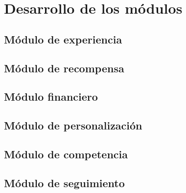 
\chapter{Desarrollo de los módulos}\label{mod:concentrado}

    \section{Módulo de experiencia}\label{mod:exp}
    

    \section{Módulo de recompensa}\label{mod:recomp}

    \section{Módulo financiero}\label{mod:financ}

    \section{Módulo de personalización}\label{mod:pers}

    \section{Módulo de competencia}\label{mod:comp}

    \section{Módulo de seguimiento}\label{mod:seguim}
